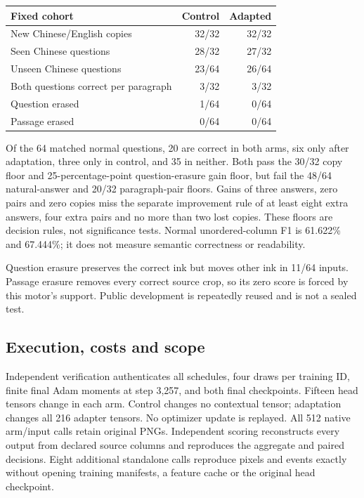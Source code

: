 \begin{center}\small
\begin{tabular}{lrr}
\toprule
Fixed cohort & Control & Adapted\\
\midrule
New Chinese/English copies & 32/32 & 32/32\\
Seen Chinese questions & 28/32 & 27/32\\
Unseen Chinese questions & 23/64 & 26/64\\
Both questions correct per paragraph & 3/32 & 3/32\\
Question erased & 1/64 & 0/64\\
Passage erased & 0/64 & 0/64\\
\bottomrule
\end{tabular}
\end{center}
Of the 64 matched normal questions, 20 are correct in both arms, six only
after adaptation, three only in control, and 35 in neither. Both pass the
30/32 copy floor and 25-percentage-point question-erasure gain floor, but
fail the 48/64 natural-answer and 20/32 paragraph-pair floors. Gains of
three answers, zero pairs and zero copies miss the separate improvement
rule of at least eight extra answers, four extra pairs and no more than
two lost copies. These floors are decision rules, not significance tests.
Normal unordered-column F1 is 61.622\% and 67.444\%; it does not measure
semantic correctness or readability.

Question erasure preserves the correct ink but moves other ink in 11/64
inputs. Passage erasure removes every correct source crop, so its zero
score is forced by this motor's support. Public development is repeatedly
reused and is not a sealed test.

\subsection*{Execution, costs and scope}
Independent verification authenticates all schedules, four draws per
training ID, finite final Adam moments at step 3,257, and both final
checkpoints. Fifteen head tensors change in each arm. Control changes no
contextual tensor; adaptation changes all 216 adapter tensors. No optimizer
update is replayed. All 512 native arm/input calls retain original PNGs.
Independent scoring reconstructs every output from declared source columns
and reproduces the aggregate and paired decisions. Eight additional
standalone calls reproduce pixels and events exactly without opening
training manifests, a feature cache or the original head checkpoint.

